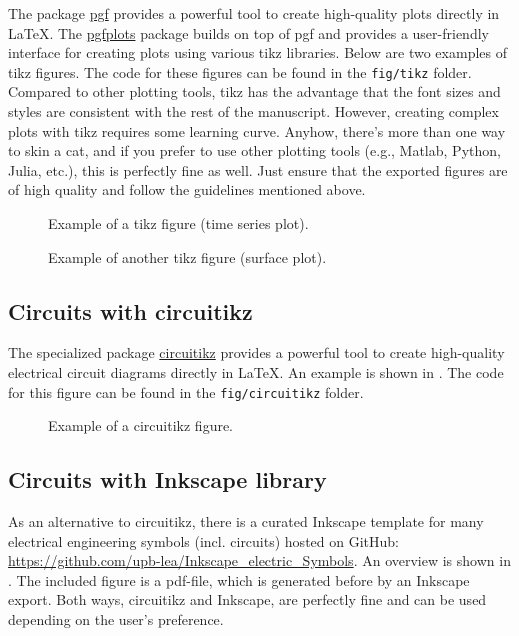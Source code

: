 The package \href{https://ctan.org/pkg/pgf}{pgf} provides a powerful tool to create high-quality plots directly in \LaTeX. The \href{https://ctan.org/pkg/pgfplots}{pgfplots} package builds on top of pgf and provides a user-friendly interface for creating plots using various tikz libraries. Below are two examples of tikz figures. The code for these figures can be found in the \texttt{fig/tikz} folder. Compared to other plotting tools, tikz has the advantage that the font sizes and styles are consistent with the rest of the manuscript. However, creating complex plots with tikz requires some learning curve. Anyhow, there's more than one way to skin a cat, and if you prefer to use other plotting tools (e.g., Matlab, Python, Julia, etc.), this is perfectly fine as well. Just ensure that the exported figures are of high quality and follow the guidelines mentioned above.
\begin{figure}[ht]
    \centering
    
    \caption{Example of a tikz figure (time series plot).}
    \label{fig:tikz_example_01}
\end{figure}
\begin{figure}[ht]
    \centering
    
    \caption{Example of another tikz figure (surface plot).}
    \label{fig:tikz_example_02}
\end{figure}


\subsection{Circuits with circuitikz}
The specialized package \href{https://ctan.org/pkg/circuitikz}{circuitikz} provides a powerful tool to create high-quality electrical circuit diagrams directly in \LaTeX. An example is shown in . The code for this figure can be found in the \texttt{fig/circuitikz} folder.
\begin{figure}[ht]
    \centering
    
    \caption{Example of a circuitikz figure.}
    \label{fig:circuitikz_example}
\end{figure}


\subsection{Circuits with Inkscape library}
As an alternative to circuitikz, there is a curated Inkscape template for many electrical engineering symbols (incl. circuits) hosted on GitHub: \href{https://github.com/upb-lea/Inkscape_electric_Symbols}{https://github.com/upb-lea/Inkscape\_electric\_Symbols}. An overview is shown in . The included figure is a pdf-file, which is generated before by an Inkscape export. Both ways, circuitikz and Inkscape, are perfectly fine and can be used depending on the user's preference.

